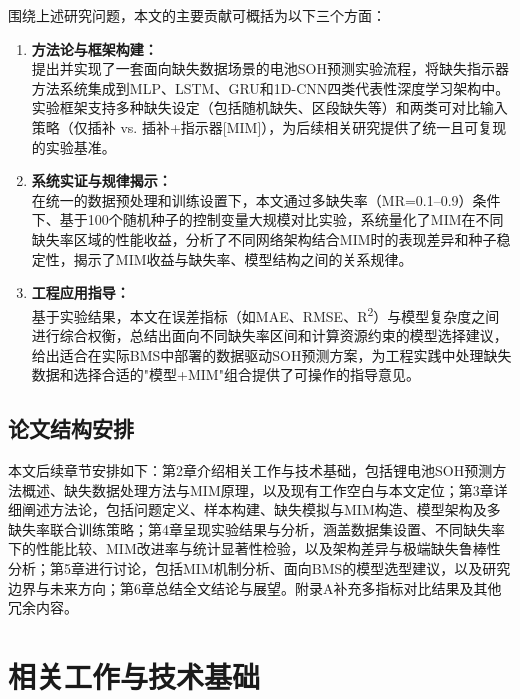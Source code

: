 \documentclass[10pt,a4paper]{ctexart}
\begin{document}
围绕上述研究问题，本文的主要贡献可概括为以下三个方面：

\begin{enumerate}[label=(\arabic*)]
    \item \textbf{方法论与框架构建：}\\
    提出并实现了一套面向缺失数据场景的电池SOH预测实验流程，将缺失指示器方法系统集成到MLP、LSTM、GRU和1D-CNN四类代表性深度学习架构中。实验框架支持多种缺失设定（包括随机缺失、区段缺失等）和两类可对比输入策略（仅插补 vs. 插补+指示器[MIM]），为后续相关研究提供了统一且可复现的实验基准。
    
    \item \textbf{系统实证与规律揭示：}\\
    在统一的数据预处理和训练设置下，本文通过多缺失率（MR=0.1--0.9）条件下、基于100个随机种子的控制变量大规模对比实验，系统量化了MIM在不同缺失率区域的性能收益，分析了不同网络架构结合MIM时的表现差异和种子稳定性，揭示了MIM收益与缺失率、模型结构之间的关系规律。
    
    \item \textbf{工程应用指导：}\\
    基于实验结果，本文在误差指标（如MAE、RMSE、R\textsuperscript{2}）与模型复杂度之间进行综合权衡，总结出面向不同缺失率区间和计算资源约束的模型选择建议，给出适合在实际BMS中部署的数据驱动SOH预测方案，为工程实践中处理缺失数据和选择合适的"模型+MIM"组合提供了可操作的指导意见。
\end{enumerate}

\subsection{论文结构安排}

本文后续章节安排如下：第2章介绍相关工作与技术基础，包括锂电池SOH预测方法概述、缺失数据处理方法与MIM原理，以及现有工作空白与本文定位；第3章详细阐述方法论，包括问题定义、样本构建、缺失模拟与MIM构造、模型架构及多缺失率联合训练策略；第4章呈现实验结果与分析，涵盖数据集设置、不同缺失率下的性能比较、MIM改进率与统计显著性检验，以及架构差异与极端缺失鲁棒性分析；第5章进行讨论，包括MIM机制分析、面向BMS的模型选型建议，以及研究边界与未来方向；第6章总结全文结论与展望。附录A补充多指标对比结果及其他冗余内容。

\section{相关工作与技术基础}\label{sec:related}
\end{document}
